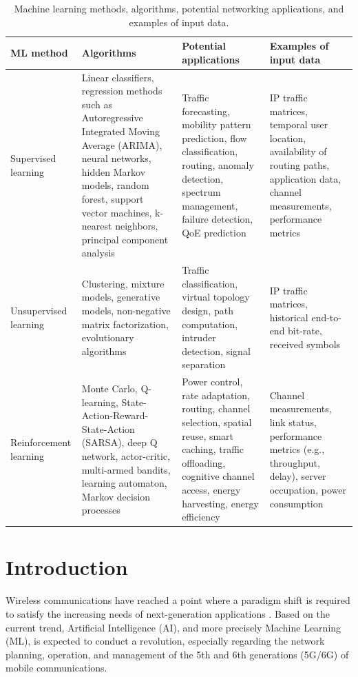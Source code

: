 \documentclass[journal]{IEEEtran}
\begin{document}
\begin{table}[t!]
	\caption{Machine learning methods, algorithms, potential networking applications, and examples of input data.}
	\label{table:ml_taxonomy}
	\centering
	\begin{tabular}{|p{}|p{}|p{}|p{}|}
		\hline
		\textbf{ML method} & \textbf{Algorithms} & \textbf{Potential applications} & \textbf{Examples of input data} \\\hline
		Supervised learning & Linear classifiers, regression methods such as Autoregressive Integrated Moving Average (ARIMA), neural networks, hidden Markov models, random forest, support vector machines, k-nearest neighbors, principal component analysis &Traffic forecasting, mobility pattern prediction, flow classification, routing, anomaly detection, spectrum management, failure detection, QoE prediction & IP traffic matrices, temporal user location, availability of routing paths, application data, channel measurements, performance metrics \\\hline
		Unsupervised learning & Clustering, mixture models, generative models, non-negative matrix factorization, evolutionary algorithms & Traffic classification, virtual topology design, path computation, intruder detection, signal separation& IP traffic matrices, historical end-to-end bit-rate, received symbols \\\hline
		Reinforcement learning & Monte Carlo, Q-learning, State-Action-Reward-State-Action (SARSA), deep Q network, actor-critic, multi-armed bandits, learning automaton, Markov decision processes & Power control, rate adaptation, routing, channel selection, spatial reuse, smart caching, traffic offloading, cognitive channel access, energy harvesting, energy efficiency & Channel measurements, link status, performance metrics (e.g., throughput, delay), server occupation, power consumption \\\hline
	\end{tabular}
\end{table}

\section{Introduction}
Wireless communications have reached a point where a paradigm shift is required to satisfy the increasing needs of next-generation applications \cite{osseiran2014scenarios}. Based on the current trend, Artificial Intelligence (AI), and more precisely Machine Learning (ML), is expected to conduct a revolution, especially regarding the network planning, operation, and management of the 5th and 6th generations (5G/6G) of mobile communications. 
\end{document}
